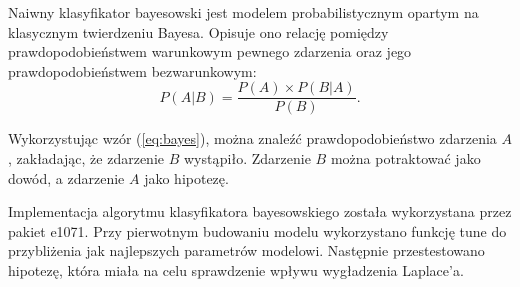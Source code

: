 
Naiwny klasyfikator bayesowski jest modelem probabilistycznym opartym na klasycznym twierdzeniu Bayesa. Opisuje ono relację pomiędzy prawdopodobieństwem warunkowym pewnego zdarzenia oraz jego prawdopodobieństwem bezwarunkowym:
\begin{equation}
\label{eq:bayes}
    P(A|B) = \frac{P(A)\times P(B|A)}{P(B)}.
\end{equation}

Wykorzystując wzór (\ref{eq:bayes}), można znaleźć prawdopodobieństwo zdarzenia $A$, zakładając, że zdarzenie $B$ wystąpiło. Zdarzenie $B$ można potraktować jako dowód, a zdarzenie $A$ jako hipotezę.

Implementacja algorytmu klasyfikatora bayesowskiego została wykorzystana przez pakiet e1071. Przy pierwotnym budowaniu modelu wykorzystano funkcję tune do przybliżenia jak najlepszych parametrów modelowi. Następnie przestestowano hipotezę, która miała na celu sprawdzenie wpływu wygładzenia Laplace'a.

